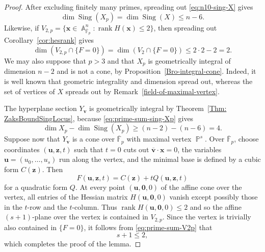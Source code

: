\documentclass[a4paper,11pt, twoside,reqno]{amsart}
\theoremstyle{plain}
\theoremstyle{definition}
\theoremstyle{remark}
\newcommand{\bu}{\bm{u}}
\newcommand{\bfv}{\bm{v}}
\newcommand{\bfx}{\bm{x}}
\newcommand{\bfz}{\bm{z}}
\DeclareMathOperator{\sing}{Sing}
\DeclareMathOperator{\rank}{rank}
\DeclareMathOperator{\A}{\mathbb{A}}
\DeclareMathOperator{\PP}{\mathbb{P}}
\DeclareMathOperator{\Sing}{Sing}
\renewcommand{\bar}{\overline}
\renewcommand{\leq}{\leqslant}
\renewcommand{\ge}{\geqslant}
\newcommand{\FF}{\mathbb{F}}
\numberwithin{equation}{section}
\begin{document}
\begin{proof}
After excluding finitely many primes,
spreading out \eqref{eq:n10-sing-X} gives
\begin{equation}
\dim\Sing(X_{p}) = \dim\Sing(X) \leq n-6.
\label{eq:prime-sum-sing-Xp}
\end{equation}
Likewise, if $V_{2,p}=\{\bfx\in\A^n_{\bar{\FF}_p}: \rank H(\bfx)\leq2\}$,
then spreading out Corollary~\ref{cor:hesrank} gives
\begin{equation}
\dim (V_{2,p} \cap \{F=0\}) = \dim (V_2 \cap \{F=0\}) \leq 2\cdot 2-2 = 2.
\label{eq:prime-sum-V2p}
\end{equation}
We may also suppose that $p>3$ and that $X_p$ is geometrically integral
of dimension $n-2$
and is not a cone,
by Proposition~\ref{Bro-integral-cone}.
Indeed, it is well known that geometric integrality
and dimension spread out,
whereas the set of vertices of $X$ spreads out by Remark~\ref{field-of-maximal-vertex}.

The hyperplane section $Y_{\bfv}$ is geometrically integral
by Theorem~\ref{Thm: ZaksBoundSingLocus},
because \eqref{eq:prime-sum-sing-Xp} gives
$$\dim X_p - \dim \sing(X_p)
\ge (n-2) - (n-6) = 4.$$
Suppose now that $Y_{\bfv}$ is a cone over $\bar{\FF}_p$
with maximal vertex $\PP^s$.  Over
$\bar{\FF}_p$, choose coordinates $(\bu,\bfz,t)$ such that $t=0$ cuts
out $\bar{\bm{v}}\cdot \bfx=0$, the variables $\bu=(u_0,\ldots,u_s)$ run along the
vertex, and the minimal base is defined by a cubic form $C(\bfz)$.  Then
\[
    F(\bu,\bfz,t)=C(\bfz)+tQ(\bu,\bfz,t)
\]
for a quadratic form $Q$.  At every point $(\bu,\bm 0,0)$ of the affine cone
over the vertex, all entries of the Hessian matrix $H(\bu,\bm 0,0)$ vanish except possibly
those in the $t$-row and the $t$-column.  Thus $\rank H(\bu,\bm 0,0)\leq2$ and so the 
affine $(s+1)$-plane over the vertex is contained in $V_{2,p}$.
Since the vertex is trivially also contained in $\{F=0\}$,
it follows from  \eqref{eq:prime-sum-V2p} that 
\[
s+1\leq 2,
\]
which completes the proof of the lemma. 
\end{proof}
\end{document}
